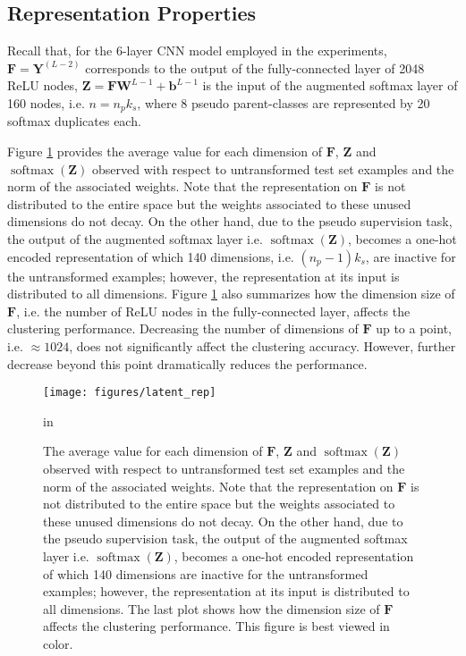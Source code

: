 \documentclass{article} \usepackage{iclr2018_conference,times}
\DeclareMathOperator{\softmax}{softmax}
\begin{document}
\subsection{Representation Properties}

Recall that, for the 6-layer CNN model employed in the experiments, $\boldsymbol{F}=\boldsymbol{Y}^{(L-2)}$ corresponds to the output of the fully-connected layer of 2048 ReLU nodes, $\boldsymbol{Z} = \boldsymbol{F}\boldsymbol{W}^{L-1} + \boldsymbol{b}^{L-1}$ is the input of the augmented softmax layer of 160 nodes, i.e. $n=n_pk_s$, where 8 pseudo parent-classes are represented by 20 softmax duplicates each. 

Figure \ref{fig:pseudo_latent_rep} provides the average value for each dimension of $\boldsymbol{F}$, $\boldsymbol{Z}$ and $\softmax(\boldsymbol{Z})$ observed with respect to untransformed test set examples and the norm of the associated weights. Note that the representation on $\boldsymbol{F}$ is not distributed to the entire space but the weights associated to these unused dimensions do not decay. On the other hand, due to the pseudo supervision task, the output of the augmented softmax layer i.e. $\softmax(\boldsymbol{Z})$, becomes a one-hot encoded representation of which 140 dimensions, i.e. $(n_p-1)k_s$, are inactive for the untransformed examples; however, the representation at its input is distributed to all dimensions. Figure \ref{fig:pseudo_latent_rep} also summarizes how the dimension size of $\boldsymbol{F}$, i.e. the number of ReLU nodes in the fully-connected layer, affects the clustering performance. Decreasing the number of dimensions of $\boldsymbol{F}$ up to a point, i.e. $\approx 1024$, does not significantly affect the clustering accuracy. However, further decrease beyond this point dramatically reduces the performance. 
\begin{figure}[h]
	\begin{center}
		\centerline{\texttt{[image: figures/latent\_rep]}}
		\caption{The average value for each dimension of $\boldsymbol{F}$, $\boldsymbol{Z}$ and $\softmax(\boldsymbol{Z})$ observed with respect to untransformed test set examples and the norm of the associated weights. Note that the representation on $\boldsymbol{F}$ is not distributed to the entire space but the weights associated to these unused dimensions do not decay. On the other hand, due to the pseudo supervision task, the output of the augmented softmax layer i.e. $\softmax(\boldsymbol{Z})$, becomes a one-hot encoded representation of which 140 dimensions are inactive for the untransformed examples; however, the representation at its input is distributed to all dimensions. The last plot shows how the dimension size of $\boldsymbol{F}$ affects the clustering performance. This figure is best viewed in color.}
		\label{fig:pseudo_latent_rep}
	\end{center}
	 in
\end{figure}
\end{document}
